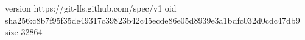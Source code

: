 version https://git-lfs.github.com/spec/v1
oid sha256:c8b7f95f35de49317c39823b42c45ecde86e05d8939e3a1bdfc032d0cdc47db9
size 32864
